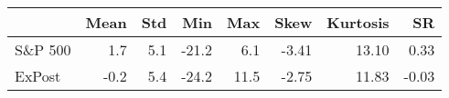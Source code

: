 \begin{tabular}{lrrrrrrr}
\hline
         &   Mean &   Std &   Min &   Max &   Skew &   Kurtosis &    SR \\
\hline
 S\&P 500 &    1.7 &   5.1 & -21.2 &   6.1 &  -3.41 &      13.10 &  0.33 \\
 ExPost  &   -0.2 &   5.4 & -24.2 &  11.5 &  -2.75 &      11.83 & -0.03 \\
\hline
\end{tabular}